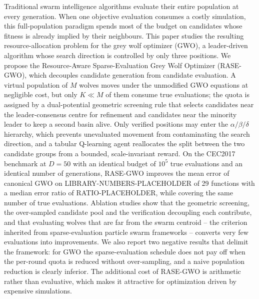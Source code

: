 Traditional swarm intelligence algorithms evaluate their entire population at
every generation. When one objective evaluation consumes a costly simulation,
this full-population paradigm spends most of the budget on candidates whose
fitness is already implied by their neighbours. This paper studies the resulting
resource-allocation problem for the grey wolf optimizer (GWO), a leader-driven
algorithm whose search direction is controlled by only three positions. We
propose the Resource-Aware Sparse-Evaluation Grey Wolf Optimizer (RASE-GWO),
which decouples candidate generation from candidate evaluation. A virtual
population of $M$ wolves moves under the unmodified GWO equations at negligible
cost, but only $K \ll M$ of them consume true evaluations; the quota is assigned
by a dual-potential geometric screening rule that selects candidates near the
leader-consensus centre for refinement and candidates near the minority leader
to keep a second basin alive. Only verified positions may enter the
$\alpha/\beta/\delta$ hierarchy, which prevents unevaluated movement from
contaminating the search direction, and a tabular Q-learning agent reallocates
the split between the two candidate groups from a bounded, scale-invariant
reward. On the CEC2017 benchmark at $D=50$ with an identical budget of
$10^{5}$ true evaluations and an identical number of generations, RASE-GWO
improves the mean error of canonical GWO on LIBRARY-NUMBERS-PLACEHOLDER of 29
functions with a median error ratio of RATIO-PLACEHOLDER, while covering the
same number of true evaluations. Ablation studies show that the geometric
screening, the over-sampled candidate pool and the verification decoupling each
contribute, and that evaluating wolves that are far from the swarm centroid --
the criterion inherited from sparse-evaluation particle swarm frameworks --
converts very few evaluations into improvements. We also report two negative
results that delimit the framework: for GWO the sparse-evaluation schedule does
not pay off when the per-round quota is reduced without over-sampling, and a
naive population reduction is clearly inferior. The additional cost of
RASE-GWO is arithmetic rather than evaluative, which makes it attractive for
optimization driven by expensive simulations.
